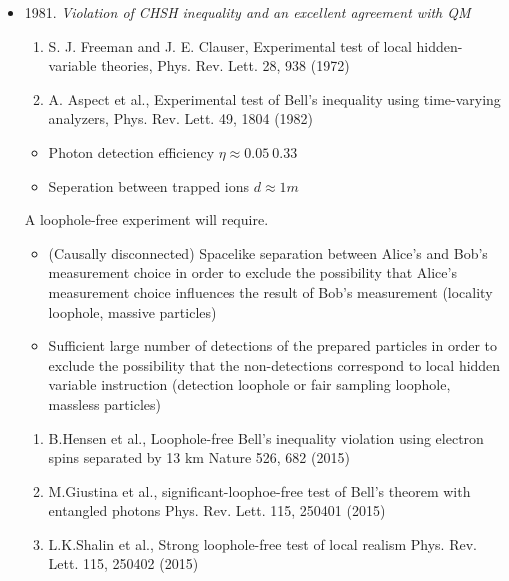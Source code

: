 \documentclass[]{book}
\newtheorem*{example}{Example}
\theoremstyle{nonumberplain}
\begin{document}
\begin{itemize}
\begin{example}
\[\] 
\end{example}
	\item 1981. \textit{Violation of CHSH inequality and an excellent agreement with QM}
\begin{enumerate}
    \item S. J. Freeman and J. E. Clauser, Experimental test of local hidden-variable theories, Phys. Rev. Lett. 28, 938 (1972)
    \item A. Aspect et al., Experimental test of Bell's inequality using time-varying analyzers, Phys. Rev. Lett. 49, 1804 (1982)
\end{enumerate}
\begin{itemize}
	\item Photon detection efficiency $\eta \approx 0.05 ~ 0.33$ 
	\item Seperation between trapped ions $d\approx 1m$ 
\end{itemize}
	A loophole-free experiment will require.
\begin{itemize}
	\item (Causally disconnected) Spacelike separation between Alice's and Bob's measurement choice in order to exclude the possibility that Alice's measurement choice influences the result of Bob's measurement (locality loophole, massive particles)
	\item Sufficient large number of detections of the prepared particles in order to exclude the possibility that the non-detections correspond to local hidden variable instruction (detection loophole or fair sampling loophole, massless particles)
\end{itemize}
\begin{enumerate}
    \item B.Hensen et al., Loophole-free Bell's inequality violation using electron spins separated by 13 km Nature 526, 682 (2015)
    \item M.Giustina et al., significant-loophoe-free test of Bell's theorem with entangled photons Phys. Rev. Lett. 115, 250401 (2015)
    \item L.K.Shalin et al., Strong loophole-free test of local realism Phys. Rev. Lett. 115, 250402 (2015)
\end{enumerate}

\end{itemize}
\end{document}
